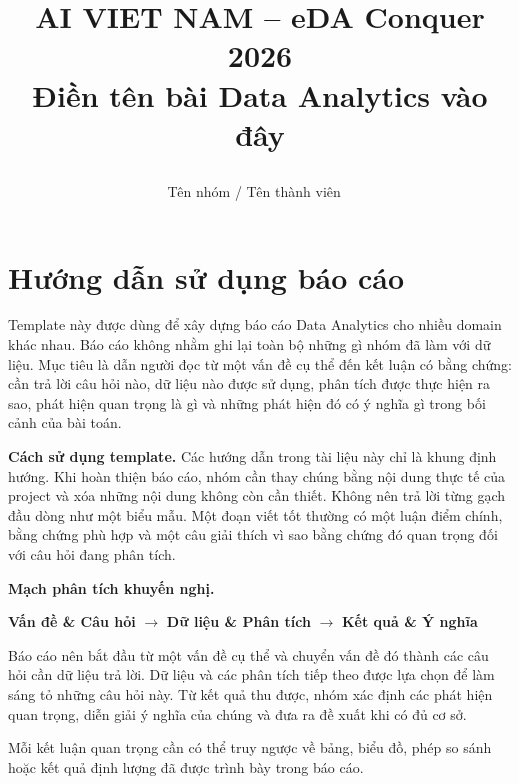 \documentclass[12pt]{eDA_conquer2026}
\title{%
  \begin{center}
        \Large {AI VIET NAM -- eDA Conquer 2026}\\[.5ex]
        \Huge \textbf{Điền tên bài Data Analytics vào đây}\\[.5ex]
  \end{center}
}
\author{
\begin{minipage}{\textwidth}
\centering
{
\vspace{-1.5em}
Tên nhóm / Tên thành viên
}\
\end{minipage}
}
\date{}
\begin{document}
\maketitle
\vspace{-5.5em}
\setlength{\epigraphwidth}{0.6\textwidth}

\section*{Hướng dẫn sử dụng báo cáo}

Template này được dùng để xây dựng báo cáo Data Analytics cho nhiều domain khác nhau. Báo cáo không nhằm ghi lại toàn bộ những gì nhóm đã làm với dữ liệu. Mục tiêu là dẫn người đọc từ một vấn đề cụ thể đến kết luận có bằng chứng: cần trả lời câu hỏi nào, dữ liệu nào được sử dụng, phân tích được thực hiện ra sao, phát hiện quan trọng là gì và những phát hiện đó có ý nghĩa gì trong bối cảnh của bài toán.

\textbf{Cách sử dụng template.}
Các hướng dẫn trong tài liệu này chỉ là khung định hướng. Khi hoàn thiện báo cáo, nhóm cần thay chúng bằng nội dung thực tế của project và xóa những nội dung không còn cần thiết. Không nên trả lời từng gạch đầu dòng như một biểu mẫu. Một đoạn viết tốt thường có một luận điểm chính, bằng chứng phù hợp và một câu giải thích vì sao bằng chứng đó quan trọng đối với câu hỏi đang phân tích.

\textbf{Mạch phân tích khuyến nghị.}

\begin{aivncodebox}[Mạch xuyên suốt báo cáo:]

\begin{center}
\textbf{Vấn đề \& Câu hỏi}
\quad $\longrightarrow$ \quad
\textbf{Dữ liệu \& Phân tích}
\quad $\longrightarrow$ \quad
\textbf{Kết quả \& Ý nghĩa}
\end{center}

Báo cáo nên bắt đầu từ một vấn đề cụ thể và chuyển vấn đề đó thành các câu hỏi cần dữ liệu trả lời. Dữ liệu và các phân tích tiếp theo được lựa chọn để làm sáng tỏ những câu hỏi này. Từ kết quả thu được, nhóm xác định các phát hiện quan trọng, diễn giải ý nghĩa của chúng và đưa ra đề xuất khi có đủ cơ sở.

Mỗi kết luận quan trọng cần có thể truy ngược về bảng, biểu đồ, phép so sánh hoặc kết quả định lượng đã được trình bày trong báo cáo.
\end{aivncodebox}
\end{document}
